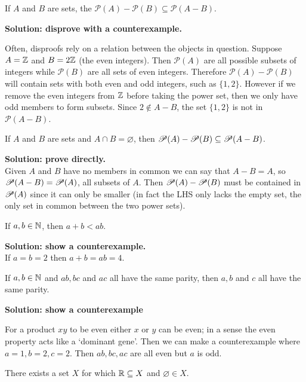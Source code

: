 \documentclass{article}
\begin{document}
\begin{problem}
If $A$ and $B$ are sets, the $\mathscr{P}(A) - \mathscr{P}(B) \subseteq \mathscr{P}(A - B)$.
\end{problem}

\textbf{Solution: disprove with a counterexample.}

Often, disproofs rely on a relation between the objects in question. Suppose $A = \mathbb{Z}$ and $B = 2\mathbb{Z}$ (the even integers). Then $\mathscr{P}(A)$ are all possible subsets of integers while $\mathscr{P}(B)$ are all sets of even integers. Therefore $\mathscr{P}(A) - \mathscr{P}(B)$ will contain sets with both even and odd integers, such as $\{1, 2\}$. However if we remove the even integers from $\mathbb{Z}$ before taking the power set, then we only have odd members to form subsets. Since $2 \not\in A - B$, the set $\{1, 2\}$ is not in $\mathscr{P}(A - B)$.

\begin{problem}
If $A$ and $B$ are sets and $A \cap B = \varnothing$, then $\mathscr{P}(A) - \mathscr{P}(B) \subseteq \mathscr{P}(A - B)$.
\end{problem}
\textbf{Solution: prove directly.}
\\
Given $A$ and $B$ have no members in common we can say that $A - B = A$, so $\mathscr{P}(A - B) = \mathscr{P}(A)$, all subsets of $A$. Then $\mathscr{P}(A) - \mathscr{P}(B)$ must be contained in $\mathscr{P}(A)$ since it can only be smaller (in fact the LHS only lacks the empty set, the only set in common between the two power sets).

\begin{problem}
If $a, b \in \mathbb{N}$, then $a + b < ab$.
\end{problem}

\textbf{Solution: show a counterexample.}
\\
If $a = b = 2$ then $a + b = ab = 4$.

\begin{problem}
If $a, b \in \mathbb{N}$ and $ab, bc$ and $ac$ all have the same parity, then $a, b$ and $c$ all have the same parity.
\end{problem}

\textbf{Solution: show a counterexample}

For a product $xy$ to be even either $x$ or $y$ can be even; in a sense the even property acts like a `dominant gene'. Then we can make a counterexample where $a = 1, b = 2, c = 2$. Then $ab, bc, ac$ are all even but $a$ is odd.

\begin{problem}
There exists a set $X$ for which $\mathbb{R} \subseteq X$ and $\varnothing \in X$.
\end{problem}
\end{document}
